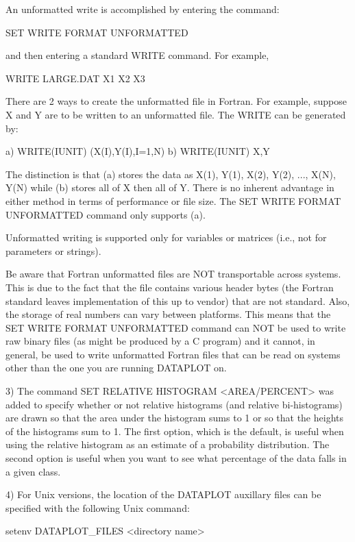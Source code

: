 {    An unformatted write is accomplished by entering the command:

       SET WRITE FORMAT UNFORMATTED

    and then entering a standard WRITE command.  For example,

       WRITE LARGE.DAT X1 X2 X3

    There are 2 ways to create the unformatted file in Fortran.  For
    example, suppose X and Y are to be written to an unformatted
    file.  The WRITE can be generated by:

    a)    WRITE(IUNIT) (X(I),Y(I),I=1,N)
    b)    WRITE(IUNIT) X,Y

    The distinction is that (a) stores the data as X(1), Y(1),
    X(2), Y(2), ..., X(N), Y(N) while (b) stores all of X then
    all of Y.  There is no inherent advantage in either method in
    terms of performance or file size.  The SET WRITE FORMAT
    UNFORMATTED command only supports (a).

    Unformatted writing is supported only for variables or matrices
    (i.e., not for parameters or strings).

    Be aware that Fortran unformatted files are NOT transportable
    across systems.  This is due to the fact that the file contains
    various header bytes (the Fortran standard leaves implementation
    of this up to vendor) that are not standard.  Also, the storage
    of real numbers can vary between platforms.  This means that
    the SET WRITE FORMAT UNFORMATTED command can NOT be used to write
    raw binary files (as might be produced by a C program) and it
    cannot, in general, be used to write unformatted Fortran files
    that can be read on systems other than the one you are running
    DATAPLOT on.

 3) The command SET RELATIVE HISTOGRAM <AREA/PERCENT> was added to
    specify whether or not relative histograms (and relative
    bi-histograms) are drawn so that the area under the histogram
    sums to 1 or so that the heights of the histograms sum to 1.
    The first option, which is the default, is useful when using the
    relative histogram as an estimate of a probability distribution.
    The second option is useful when you want to see what percentage
    of the data falls in a given class.

 4) For Unix versions, the location of the DATAPLOT auxillary files
    can be specified with the following Unix command:

       setenv DATAPLOT_FILES <directory name>

}
